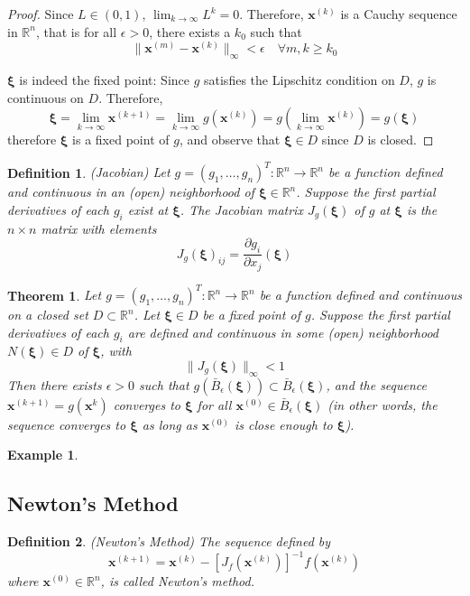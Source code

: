 \documentclass[12pt]{article}
\newtheorem{theorem}{Theorem}
\newtheorem{definition}{Definition}
\theoremstyle{definition}
\newtheorem{example}{Example}
\newcommand{\e}{\epsilon}
\newcommand{\R}{\mathbb{R}}
\newcommand{\norm}[1]{\lVert#1\rVert}
\newcommand{\x}{\bm{x}}
\newcommand{\xib}{\bm{\xi}}
\begin{document}
\begin{proof}
Since $L \in (0,1)$, $\lim_{k\to\infty} L^k = 0$. Therefore, $\x^{(k)}$ is a Cauchy sequence in $\R^n$, that is for all $\e > 0$, there exists a $k_0$ such that 
\begin{equation}
	\norm{\x^{(m)} - \x^{(k)}}_\infty < \e \quad \forall m,k \geq k_0
\end{equation}

$\xib$ is indeed the fixed point: Since $g$ satisfies the Lipschitz condition on $D$, $g$ is continuous on $D$. Therefore, 
\begin{equation}
	\xib = \lim_{k \to \infty} \x^{(k+1)} = \lim_{k \to \infty} g(\x^{(k)}) = g \left( \lim_{k \to \infty} \x^{(k)} \right) = g(\xib)
\end{equation}
therefore $\xib$ is a fixed point of $g$, and observe that $\xib \in D$ since $D$ is closed. 
\end{proof}

\begin{definition}(Jacobian)
Let $g = (g_1, \ldots, g_n)^T : \R^n \to \R^n$ be a function defined and continuous in an (open) neighborhood of $\xib \in \R^n$. Suppose the first partial derivatives of each $g_i$ exist at $\xib$. The Jacobian matrix $J_g(\xib)$ of $g$ at $\xib$ is the $n \times n$ matrix with elements
\begin{equation}
	J_g(\xib)_{ij} = \frac{\partial g_i}{\partial x_j} (\xib) 
\end{equation}
\end{definition}

\begin{theorem}
Let $g = (g_1, \ldots, g_n)^T : \R^n \to \R^n$ be a function defined and continuous on a closed set $D \subset \R^n$. Let $\xib \in D$ be a fixed point of $g$. Suppose the first partial derivatives of each $g_i$ are defined and continuous in some (open) neighborhood $N(\xib) \in D$ of $\xib$, with 
\begin{equation}
	\norm{J_g(\xib)}_\infty < 1  	
\end{equation}
Then there exists $\e > 0$ such that $g (\bar B_\e(\xib)) \subset \bar B_\e(\xib)$, and the sequence $\x^{(k+1)} = g(\x^{k})$ converges to $\xib$ for all $\x^{(0)} \in \bar B_\e(\xib)$ (in other words, the sequence converges to $\xib$ as long as $\x^{(0)}$ is close enough to $\xib$).
\end{theorem}

\begin{example}

\end{example}

\subsection*{Newton's Method}
\begin{definition}(Newton's Method)
	The sequence defined by
	\begin{equation}
		\x^{(k+1)} = \x^{(k)} - [J_f(\x^{(k)})]^{-1} f(\x^{(k)})
	\end{equation}
	where $\x^{(0)} \in \R^n$, is called Newton's method. 
\end{definition}
\end{document}
